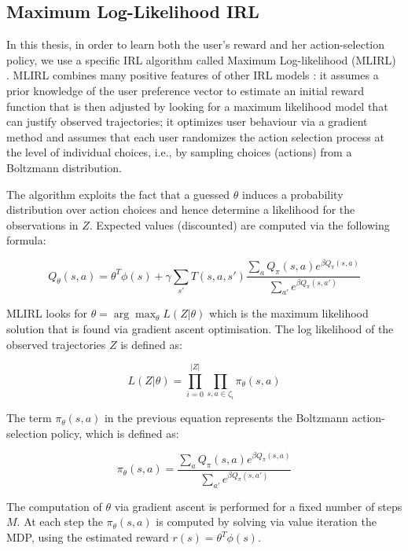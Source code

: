 \subsection{Maximum Log-Likelihood IRL}
In this thesis, in order to learn both the user's reward and her action-selection policy, we use a specific IRL algorithm called Maximum Log-likelihood (MLIRL) \cite{vro:litt:2011}. 
MLIRL combines many positive features of other IRL models \cite{bayesianIRL,maxentirl,policymatchingirl}: it assumes a prior knowledge of the user preference vector to estimate an initial reward function that is then adjusted by looking for a maximum likelihood model that can justify observed trajectories; it optimizes user behaviour via a gradient method and assumes that each user randomizes the action selection process at the level of individual choices, i.e., by sampling choices (actions) from a Boltzmann distribution. 

The algorithm exploits the fact that a guessed $\theta$ induces a probability distribution over action choices and hence determine a likelihood for the observations in $Z$. Expected values (discounted) are computed via the following formula:

$$Q_\theta(s,a) = \theta^T\phi(s)+\gamma\sum_{s'}T(s,a,s')\frac{\sum_a Q_\pi(s,a)e^{\beta Q_\pi(s,a)}}{\sum_{a'}e^{\beta Q_\pi(s,a')} }$$

MLIRL looks for $\theta = \arg\max_\theta L(Z|\theta)$ which is the maximum likelihood solution that is found via gradient ascent optimisation. 
The log likelihood of the observed trajectories $Z$ is defined as:

$$L(Z|\theta) = \prod_{i=0}^{|Z|} \prod_{s,a \in \zeta_i} \pi_\theta(s,a)$$

The term $\pi_\theta(s,a)$ in the previous equation represents the Boltzmann action-selection policy, which is defined as:

$$\pi_\theta(s,a) = \frac{\sum_a Q_\pi(s,a)e^{\beta Q_\pi(s,a)}}{\sum_{a'}e^{\beta Q_\pi(s,a')}}$$

The computation of $\theta$ via gradient ascent is performed for a fixed number of steps $M$. At each step the $\pi_\theta(s,a)$ is computed by solving via value iteration the MDP, using the estimated reward $r(s) = \theta^T \phi(s)$.

